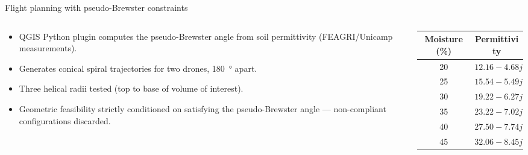 \documentclass[9pt,aspectratio=169]{beamer}
\begin{document}
\begin{frame}{Flight planning with pseudo-Brewster constraints}
  \begin{columns}[T,onlytextwidth]
    \begin{column}{0.5\textwidth}
      \begin{itemize}
        \item QGIS Python plugin computes the pseudo-Brewster angle from soil permittivity (FEAGRI/Unicamp measurements).
        \item Generates \alert{conical spiral} trajectories for two drones, \SI{180}{\degree} apart.
        \item Three helical radii tested (top to base of volume of interest).
        \item Geometric feasibility \alert{strictly conditioned} on satisfying the pseudo-Brewster angle --- non-compliant configurations discarded.
      \end{itemize}
    \end{column}
    \begin{column}{0.5\textwidth}
      \centering
      \small
      \begin{tabular}{cc}
        \toprule
        Moisture (\%) & Permittivity \\
        \midrule
        20 & $12.16 - 4.68j$ \\
        25 & $15.54 - 5.49j$ \\
        30 & $19.22 - 6.27j$ \\
        35 & $23.22 - 7.02j$ \\
        40 & $27.50 - 7.74j$ \\
        45 & $32.06 - 8.45j$ \\
        \bottomrule
      \end{tabular}
    \end{column}
  \end{columns}
\end{frame}
\end{document}
